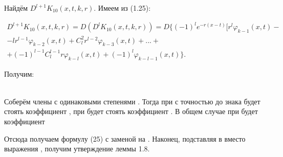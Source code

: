 Найдём $ D^{l+1}K_{10}(x,t,k,r) $. Имеем из (1.25):

\begin{equation}
\begin{array}{c}
\nonumber

D^{l+1}K_{10}(x,t,k,r) = D(D^lK_{10}(x,t,k,r)) = D\lbrace (-1)^le^{-r(x-t)}[r^l\varphi_{k-1}(x,t) - \\
- lr^{l-1}\varphi_{k-2}(x,t) + C_l^2r^{l-2}\varphi_{k-3}(x,t) + ... + \\ + (-1)^{l-1}C_l^{l-1}r\varphi_{k-l}(x,t) + (-1)^l\varphi_{k-l-1}(x,t)\rbrace .

\end{array}
\end{equation}

Получим:

\begin{equation}
\begin{array}{c}
\nonumber



\end{array}
\end{equation}

Соберём члены с одинаковыми степенями . Тогда при  с точностью до знака будет стоять коэффициент , при   будет стоять коэффициент .
В общем случае при  будет коэффициент

Отсюда получаем формулу (25) с заменой  на . Наконец, подставляя в  вместо  выражения , получим утверждение леммы 1.8.

